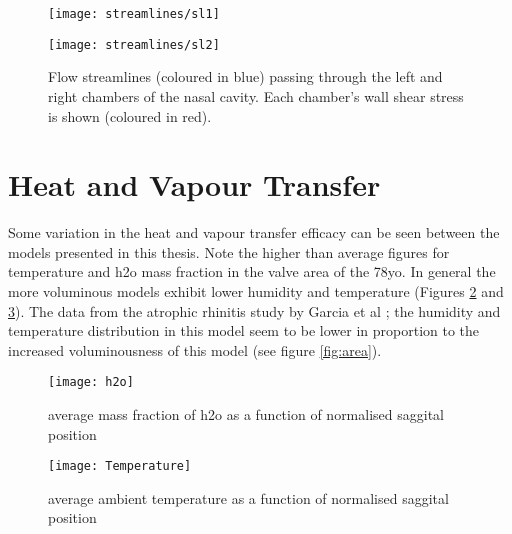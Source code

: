 \begin{figure} 
  \texttt{[image: streamlines/sl1]}
  \end{figure}

\begin{figure} 
  \texttt{[image: streamlines/sl2]}
  \caption{Flow streamlines (coloured in blue) passing through the left and right chambers of the nasal cavity. Each chamber’s wall shear stress is shown (coloured in red).}
  \label{fig:vsl}
\end{figure}

 
\section{Heat and Vapour Transfer}

Some variation in the heat and vapour transfer efficacy can be seen between the models presented in this thesis. Note the higher than average figures for temperature and h2o mass fraction in the valve area of the 78yo. In general the more voluminous models exhibit lower humidity and temperature (Figures \ref{fig:h2o} and \ref{fig:Temp}). The data from the atrophic rhinitis study by Garcia et al \cite{Garcia2007}; the humidity and temperature distribution in this model seem to be lower in proportion to the increased voluminousness of this model (see figure \ref{fig:area}).

\begin{figure} 
  \texttt{[image: h2o]}
  \caption{average mass fraction of h2o as a function of normalised saggital position}
  \label{fig:h2o}
\end{figure}


\begin{figure} 
  \texttt{[image: Temperature]}
  \caption{average ambient temperature as a function of normalised saggital position}
  \label{fig:Temp}
\end{figure}
